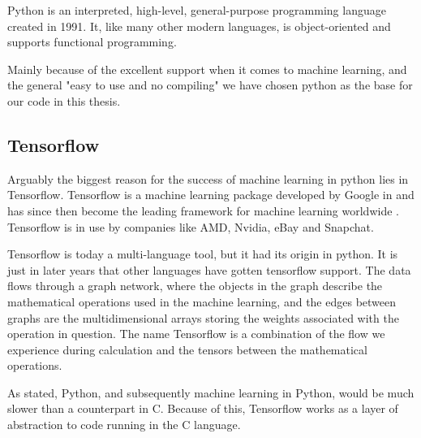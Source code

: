 Python is an interpreted, high-level, general-purpose programming language created in 1991.   It, like many other modern languages, is object-oriented and supports functional programming. 

Mainly because of the excellent support when it comes to machine learning, and the general "easy to use and no compiling" we have chosen python as the base for our code in this thesis. 



\subsection{Tensorflow}
Arguably the biggest reason for the success of machine learning in python lies in Tensorflow. Tensorflow is a machine learning package developed by Google in  and has since then become the leading framework for machine learning worldwide .  
Tensorflow is in use by companies like AMD, Nvidia, eBay and Snapchat. 



Tensorflow is today a multi-language tool, but it had its origin in python. It is just in later years that other languages have gotten tensorflow support.  
The data flows through a graph network, where the objects in the graph describe the mathematical operations used in the machine learning, and the edges between graphs are the multidimensional arrays storing the weights associated with the operation in question. The name Tensorflow is a combination of the flow we experience during calculation and the tensors between the mathematical operations. 

As stated, Python, and subsequently machine learning in Python, would be much slower than a counterpart in C. Because of this, Tensorflow works as a layer of abstraction to code running in the C language. 
 



